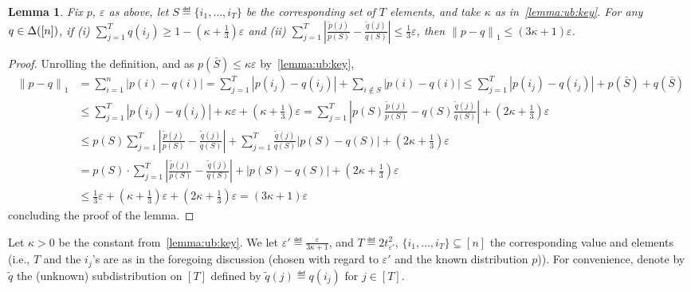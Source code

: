 \documentclass[11pt]{article}
\newtheorem{lemma}[lem]{Lemma}
\theoremstyle{remark}   	\newtheorem{remark}[theorem]{Remark}
\theoremstyle{definition}   	\newaliascnt{defn}{theorem}
\newcommand{\eps}{\ensuremath{\varepsilon}\xspace}
\newcommand{\norm}[1]{\lVert#1{\rVert}}
\newcommand{\normone}[1]{{\norm{#1}}_1}
\newcommand{\abs}[1]{\left\lvert #1 \right\rvert}
\begin{document}
\begin{lemma}\label{lemma:ub:easy}
  Fix $p$, $\eps$ as above, let $S\eqdef \{i_1,\dots, i_T\}$ be the corresponding set of $T$ elements, and take $\kappa$ as in~\autoref{lemma:ub:key}. For any $q\in\Delta\!\left([n]\right)$, if \textsf{(i)} $\sum_{j=1}^T q(i_j) \geq 1-(\kappa+\tfrac{1}{3})\eps$ and \textsf{(ii)} $\sum_{j=1}^T \abs{ \frac{\tilde{p}(j)}{p(S)} - \frac{\tilde{q}(j)}{q(S)} } \leq \tfrac{1}{3}\eps$, then $\normone{p-q}\leq (3\kappa+1)\eps$.
\end{lemma}
\begin{proof}
Unrolling the definition, and as $p( \bar{S} )\leq \kappa\eps$ by~\autoref{lemma:ub:key},
\begin{align*}
  \normone{p-q} &= \sum_{i=1}^n \abs{ p(i)-q(i) }
  = \sum_{j=1}^T \abs{ p(i_j)-q(i_j) } + \sum_{i\notin S} \abs{ p(i)-q(i) }
  \leq \sum_{j=1}^T \abs{ p(i_j)-q(i_j) } + p( \bar{S} ) + q( \bar{S} ) \\
  &\leq \sum_{j=1}^T \abs{ p(i_j)-q(i_j) } + \kappa\eps + (\kappa+\tfrac{1}{3})\eps
  = \sum_{j=1}^T \abs{ p(S)\frac{\tilde{p}(j)}{p(S)}-q(S)\frac{\tilde{q}(j)}{q(S)} } + (2\kappa+\tfrac{1}{3})\eps \\
  &\leq p(S)\sum_{j=1}^T \abs{ \frac{\tilde{p}(j)}{p(S)}-\frac{\tilde{q}(j)}{q(S)} } + \sum_{j=1}^T \frac{\tilde{q}(j)}{q(S)}\abs{  p(S) - q(S) } + (2\kappa+\tfrac{1}{3})\eps\\
  &= p(S)\cdot \sum_{j=1}^T \abs{ \frac{\tilde{p}(j)}{p(S)}-\frac{\tilde{q}(j)}{q(S)} } + \abs{  p(S) - q(S) } + (2\kappa+\tfrac{1}{3})\eps \\
  &\leq \tfrac{1}{3}\eps + (\kappa+\tfrac{1}{3})\eps + (2\kappa+\tfrac{1}{3})\eps = (3\kappa+1)\eps
\end{align*}
concluding the proof of the lemma.
\end{proof}

  Let $\kappa>0$ be the constant from~\autoref{lemma:ub:key}. We let $\eps' \eqdef \frac{\eps}{3\kappa+1}$, and $T\eqdef 2t^2_{\eps'}$, $\{i_1,\dots,i_T\}\subseteq [n]$ the corresponding value and elements (i.e., $T$ and the $i_j$'s are as in the foregoing discussion (chosen with regard to $\eps'$ and the known distribution $p$)). For convenience, denote by $\tilde{q}$ the (unknown) subdistribution on $[T]$ defined by $\tilde{q}(j) \eqdef q(i_j)$ for $j\in[T]$.
  
\end{document}
